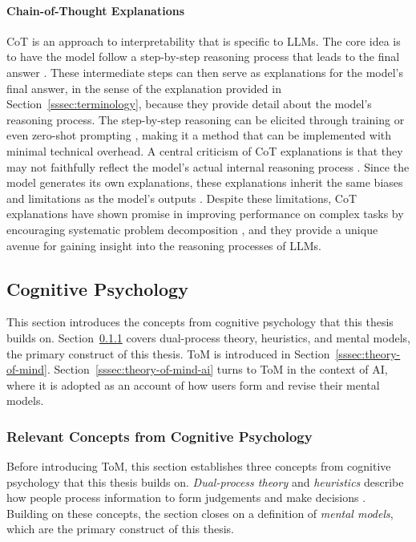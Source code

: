 \paragraph*{Chain-of-Thought Explanations}

\ac{CoT} is an approach to interpretability that is specific to \acp{LLM}. The core idea is to have the model follow a step-by-step reasoning process that leads to the final answer \parencite{Wei2022}. These intermediate steps can then serve as explanations for the model's final answer, in the sense of the explanation provided in Section~\ref{sssec:terminology}, because they provide detail about the model's reasoning process. The step-by-step reasoning can be elicited through training \parencite{Kim2023} or even zero-shot prompting \parencite{Kojima2022}, making it a method that can be implemented with minimal technical overhead. A central criticism of \ac{CoT} explanations is that they may not faithfully reflect the model's actual internal reasoning process \parencite{Lyu2023}. Since the model generates its own explanations, these explanations inherit the same biases and limitations as the model's outputs \parencite{Lyu2023}. Despite these limitations, \ac{CoT} explanations have shown promise in improving performance on complex tasks by encouraging systematic problem decomposition \parencite{Wei2022}, and they provide a unique avenue for gaining insight into the reasoning processes of \acp{LLM}.

\subsection{Cognitive Psychology} \label{ssec:cognitive-psychology}

This section introduces the concepts from cognitive psychology that this thesis builds on. Section~\ref{sssec:cognitive-psychology-concepts} covers dual-process theory, heuristics, and mental models, the primary construct of this thesis. \ac{ToM} is introduced in Section~\ref{sssec:theory-of-mind}. Section~\ref{sssec:theory-of-mind-ai} turns to \ac{ToM} in the context of \ac{AI}, where it is adopted as an account of how users form and revise their mental models.

\subsubsection{Relevant Concepts from Cognitive Psychology} \label{sssec:cognitive-psychology-concepts}

Before introducing \ac{ToM}, this section establishes three concepts from cognitive psychology that this thesis builds on. \textit{Dual-process theory} and \textit{heuristics} describe how people process information to form judgements and make decisions \parencite[cf.][]{Jussupow2021}. Building on these concepts, the section closes on a definition of \textit{mental models}, which are the primary construct of this thesis.

